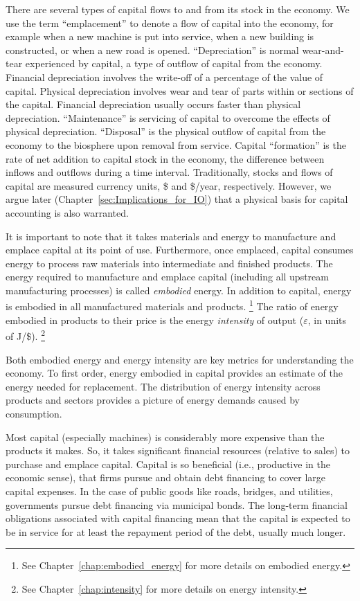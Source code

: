 There are several types of capital flows
to and from its stock in the economy.
We use the term ``emplacement'' to denote a flow of capital into
the economy, for example when a new machine is put into service,
when a new building is constructed, or
when a new road is opened.
``Depreciation'' is normal wear-and-tear experienced by capital, 
a type of outflow of capital from the economy.
Financial depreciation involves the write-off of a percentage 
of the value of capital.
Physical depreciation involves wear and tear of parts within or sections of the capital.
Financial depreciation usually occurs faster than physical depreciation.
``Maintenance'' is servicing of capital to overcome the effects of physical depreciation.
``Disposal'' is the physical outflow of capital from the economy to the biosphere
upon removal from service.
Capital ``formation'' is the rate of net
addition to capital stock in the economy,
the difference between inflows and outflows
during a time interval.
Traditionally, stocks and flows of capital are measured currency units, 
\$ and \$/year, respectively.
However, we argue later (Chapter~\ref{sec:Implications_for_IO})
that a physical basis for capital accounting is also warranted.

It is important to note that it takes materials and energy
to manufacture and emplace capital at its point of use.
Furthermore, once emplaced,
capital consumes energy to process raw materials 
into intermediate and finished products.
The energy required to manufacture and emplace capital
(including all upstream manufacturing processes)
is called \emph{embodied} energy.
In addition to capital, energy is embodied in all manufactured materials and
products.%
	\footnote{
	See Chapter~\ref{chap:embodied_energy} for more details
	on embodied energy.
	}
The ratio of energy embodied in products to their price 
is the energy \emph{intensity} of output ($\varepsilon$, 
in units of J/\$).%
	\footnote{
	See Chapter~\ref{chap:intensity} for more details 
	on energy intensity.
	}

Both embodied energy and energy intensity are key metrics 
for understanding the economy.
To first order, energy embodied in capital provides an estimate of the 
energy needed for replacement.
The distribution of energy intensity
across products and sectors
provides a picture of energy demands caused by consumption.

Most capital (especially machines) is considerably more expensive
than the products it makes.
So, it takes significant financial resources (relative to sales) 
to purchase and emplace capital.
Capital is so beneficial (i.e., productive in the economic sense), 
that firms pursue and obtain debt financing to cover large capital expenses.
In the case of public goods like roads, bridges, and utilities,
governments pursue debt financing via municipal bonds.
The long-term financial obligations associated with capital financing 
mean that the capital is expected to be in service
for at least the repayment period of the debt,
usually much longer.

